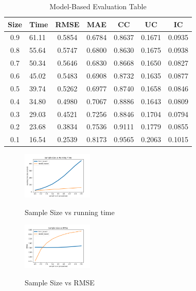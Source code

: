 \documentclass[12pt,journal,compsoc]{IEEEtran}
\begin{document}
\begin{table}[H] 
\centering
\caption{\label{tab_est:1} Model-Based Evaluation Table}
\label{my-label}
\begin{tabular}{c|lccccc}
\hline \hline
Size	    & Time	& RMSE	    & MAE	    & CC	    & UC	    & IC     \\ \hline
0.9	        & 61.11	& 0.5854	& 0.6784	& 0.8637	& 0.1671	& 0.0935 \\ \hline
0.8	        & 55.64	& 0.5747	& 0.6800	& 0.8630	& 0.1675	& 0.0938 \\ \hline
0.7	        & 50.34	& 0.5646	& 0.6830	& 0.8668	& 0.1650	& 0.0827 \\ \hline
0.6	        & 45.02	& 0.5483	& 0.6908	& 0.8732	& 0.1635	& 0.0877 \\ \hline
0.5	        & 39.74	& 0.5262	& 0.6977	& 0.8740	& 0.1658	& 0.0846 \\ \hline
0.4	        & 34.80	& 0.4980	& 0.7067	& 0.8886	& 0.1643	& 0.0809 \\ \hline
0.3	        & 29.03	& 0.4521	& 0.7256	& 0.8846	& 0.1704	& 0.0794 \\ \hline
0.2	        & 23.68	& 0.3834	& 0.7536	& 0.9111	& 0.1779	& 0.0855 \\ \hline
0.1	        & 16.54	& 0.2539	& 0.8173	& 0.9565	& 0.2063	& 0.1015 \\ \hline


\hline
\end{tabular}
\end{table}


\begin{figure}[H]
\centering
\caption{Sample Size vs running time}
\includegraphics[width=0.30\textwidth]{img/2Svstime.png}
\label{fig_sim}
\end{figure}

\begin{figure}[H]
\centering
\caption{Sample Size vs RMSE}
\includegraphics[width=0.30\textwidth]{img/2Svsrmse.png}
\label{fig_sim}
\end{figure}
\end{document}
